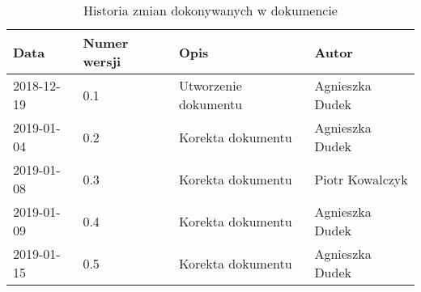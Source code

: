 \documentclass{article}
\begin{document}
\begin{titlepage}






\end{titlepage}

\addtocounter{page}{1}
\newpage

\begin{table}[h!]
	\begin{center}
		\caption{Historia zmian dokonywanych w dokumencie}
		\begin{tabular}{|l|l|l|l|}
			\hline
			Data & Numer wersji & Opis & Autor \\
			\hline \hline
			2018-12-19 & 0.1 & Utworzenie dokumentu & Agnieszka Dudek \\
			\hline
			2019-01-04 & 0.2 & Korekta dokumentu & Agnieszka Dudek \\
			\hline
			2019-01-08 & 0.3 & Korekta dokumentu & Piotr Kowalczyk \\
			\hline 
			2019-01-09 & 0.4 & Korekta dokumentu & Agnieszka Dudek \\
			\hline 
			2019-01-15 & 0.5 & Korekta dokumentu & Agnieszka Dudek \\
			\hline 


    \end{tabular}
	\end{center}
\end{table}	

\tableofcontents

\newpage
\end{document}
